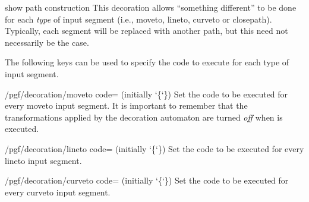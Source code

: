 \begin{decoration}{show path construction}
    This decoration allows ``something different'' to be done for each
    \emph{type} of input segment (i.e., moveto, lineto, curveto or closepath).
    Typically, each segment will be replaced with another path, but this need
    not necessarily be the case.
\begin{codeexample}[preamble={\usetikzlibrary{decorations.pathreplacing}}]
\end{codeexample}

    The following keys can be used to specify the code to execute for each type
    of input segment.

    \begin{key}{/pgf/decoration/moveto code= (initially \char`\{\char`\})}
        Set the code to be executed for every moveto input segment. It is
        important to remember that the transformations applied by the
        decoration automaton are turned \emph{off} when  is
        executed.
    \end{key}

    \begin{key}{/pgf/decoration/lineto code= (initially \char`\{\char`\})}
        Set the code to be executed for every lineto input segment.
    \end{key}

    \begin{key}{/pgf/decoration/curveto code= (initially \char`\{\char`\})}
        Set the code to be executed for every curveto input segment.
    \end{key}


\end{decoration}
